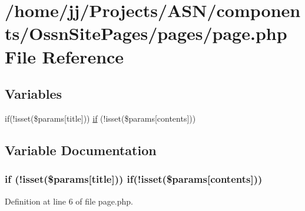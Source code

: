 \hypertarget{components_2_ossn_site_pages_2pages_2page_8php}{}\section{/home/jj/\+Projects/\+A\+S\+N/components/\+Ossn\+Site\+Pages/pages/page.php File Reference}
\label{components_2_ossn_site_pages_2pages_2page_8php}
\subsection*{Variables}
\begin{DoxyCompactItemize}
\item 
if(!isset(\$params\mbox{[}\textquotesingle{}title\textquotesingle{}\mbox{]})) \hyperlink{components_2_ossn_site_pages_2pages_2page_8php_a16a261dbf3c4683ba6147e97cffbbd4b}{if} (!isset(\$params\mbox{[}\textquotesingle{}contents\textquotesingle{}\mbox{]}))
\end{DoxyCompactItemize}


\subsection{Variable Documentation}
\subsubsection[{\texorpdfstring{if}{if}}]{\setlength{\rightskip}{0pt plus 5cm}if (!isset(\$params\mbox{[}\textquotesingle{}title\textquotesingle{}\mbox{]})) if(!isset(\$params\mbox{[}\textquotesingle{}contents\textquotesingle{}\mbox{]}))}\hypertarget{components_2_ossn_site_pages_2pages_2page_8php_a16a261dbf3c4683ba6147e97cffbbd4b}{}\label{components_2_ossn_site_pages_2pages_2page_8php_a16a261dbf3c4683ba6147e97cffbbd4b}


Definition at line 6 of file page.\+php.

